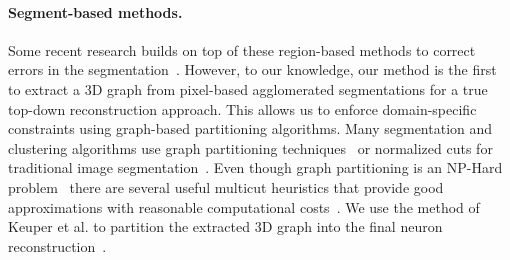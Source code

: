 \paragraph{Segment-based methods.}
Some recent research builds on top of these region-based methods to correct errors in the segmentation~\cite{rolnick2017morphological,error_correction_using_CNN,haehn2017guided}.
However, to our knowledge, our method is the first to extract a 3D graph from pixel-based agglomerated segmentations for a true top-down reconstruction approach. This allows us to enforce domain-specific constraints using graph-based partitioning algorithms. Many segmentation and clustering algorithms use graph partitioning techniques~\cite{andres2012globally} or normalized cuts for traditional image segmentation~\cite{kappes2016higher,shi2000normalized,tatiraju2008image}.
Even though graph partitioning is an NP-Hard problem~\cite{demaine2006correlation} there are several useful multicut heuristics that provide good approximations with reasonable computational costs~\cite{horvnakova2017analysis}. We use the method of Keuper et al. to partition the extracted 3D graph into the final neuron reconstruction~\cite{keuper2015efficient}.
